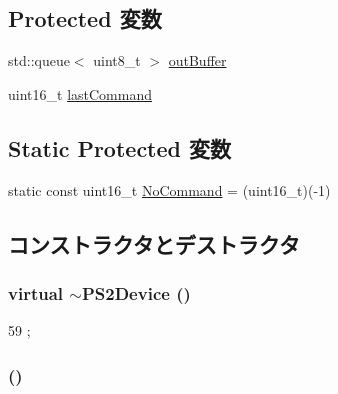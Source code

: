 \subsection*{Protected 変数}
\begin{DoxyCompactItemize}
\item 
std::queue$<$ uint8\_\-t $>$ \hyperlink{classX86ISA_1_1PS2Device_a89ae3ffe23f18460b725ac460c577049}{outBuffer}
\item 
uint16\_\-t \hyperlink{classX86ISA_1_1PS2Device_a0db1139e4bbd0a84a125c3aec0cb4334}{lastCommand}
\end{DoxyCompactItemize}
\subsection*{Static Protected 変数}
\begin{DoxyCompactItemize}
\item 
static const uint16\_\-t \hyperlink{classX86ISA_1_1PS2Device_afa7b02fd8bda5e1de413e0b8776294ad}{NoCommand} = (uint16\_\-t)(-\/1)
\end{DoxyCompactItemize}


\subsection{コンストラクタとデストラクタ}
\hypertarget{classX86ISA_1_1PS2Device_a301312a5e152ace246063d63da23028e}{
\subsubsection[{$\sim$PS2Device}]{\setlength{\rightskip}{0pt plus 5cm}virtual $\sim${\bf PS2Device} ()}}
\label{classX86ISA_1_1PS2Device_a301312a5e152ace246063d63da23028e}



\begin{DoxyCode}
59     {};
\end{DoxyCode}
\hypertarget{classX86ISA_1_1PS2Device_a428b97491100c33940d240972502bae7}{
\subsubsection[{PS2Device}]{ ()}}
\label{classX86ISA_1_1PS2Device_a428b97491100c33940d240972502bae7}



